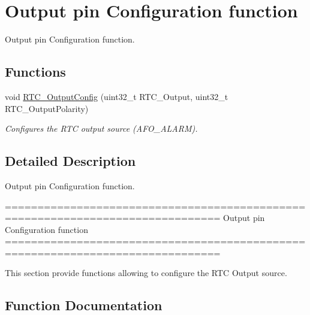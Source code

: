\hypertarget{group___r_t_c___group6}{}\section{Output pin Configuration function}
\label{group___r_t_c___group6}


Output pin Configuration function.  


\subsection*{Functions}
\begin{DoxyCompactItemize}
\item 
void \hyperlink{group___r_t_c___group6_gae3165ef19ef3bd63789e59130ad8d89b}{R\+T\+C\+\_\+\+Output\+Config} (uint32\+\_\+t R\+T\+C\+\_\+\+Output, uint32\+\_\+t R\+T\+C\+\_\+\+Output\+Polarity)
\begin{DoxyCompactList}\small\item\em Configures the R\+T\+C output source (A\+F\+O\+\_\+\+A\+L\+A\+R\+M). \end{DoxyCompactList}\end{DoxyCompactItemize}


\subsection{Detailed Description}
Output pin Configuration function. 

\begin{DoxyVerb} ===============================================================================
                         Output pin Configuration function
 ===============================================================================  

  This section provide functions allowing to configure the RTC Output source.\end{DoxyVerb}
 

\subsection{Function Documentation}
\hypertarget{group___r_t_c___group6_gae3165ef19ef3bd63789e59130ad8d89b}{}
